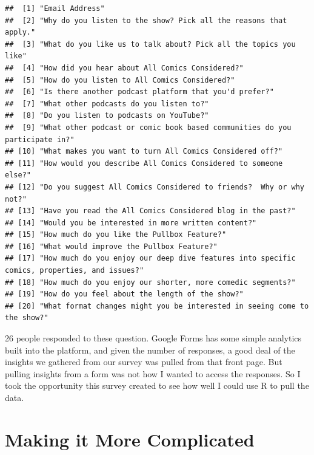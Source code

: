 \documentclass[]{article}
\begin{document}
\begin{verbatim}
##  [1] "Email Address"                                                                             
##  [2] "Why do you listen to the show? Pick all the reasons that apply."                           
##  [3] "What do you like us to talk about? Pick all the topics you like"                           
##  [4] "How did you hear about All Comics Considered?"                                             
##  [5] "How do you listen to All Comics Considered?"                                               
##  [6] "Is there another podcast platform that you'd prefer?"                                      
##  [7] "What other podcasts do you listen to?"                                                     
##  [8] "Do you listen to podcasts on YouTube?"                                                     
##  [9] "What other podcast or comic book based communities do you participate in?"                 
## [10] "What makes you want to turn All Comics Considered off?"                                    
## [11] "How would you describe All Comics Considered to someone else?"                             
## [12] "Do you suggest All Comics Considered to friends?  Why or why not?"                         
## [13] "Have you read the All Comics Considered blog in the past?"                                 
## [14] "Would you be interested in more written content?"                                          
## [15] "How much do you like the Pullbox Feature?"                                                 
## [16] "What would improve the Pullbox Feature?"                                                   
## [17] "How much do you enjoy our deep dive features into specific comics, properties, and issues?"
## [18] "How much do you enjoy our shorter, more comedic segments?"                                 
## [19] "How do you feel about the length of the show?"                                             
## [20] "What format changes might you be interested in seeing come to the show?"
\end{verbatim}

26 people responded to these question. Google Forms has some simple
analytics built into the platform, and given the number of responses, a
good deal of the insights we gathered from our survey was pulled from
that front page. But pulling insights from a form was not how I wanted
to access the responses. So I took the opportunity this survey created
to see how well I could use R to pull the data.

\section{Making it More Complicated}\label{making-it-more-complicated}
\end{document}
